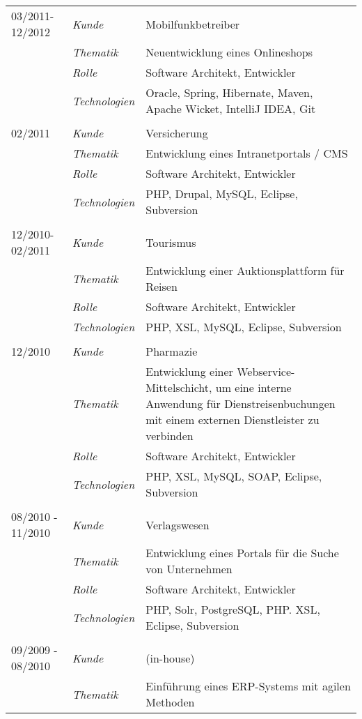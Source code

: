 \begin{longtable}{@{}>{}p{4cm}>{\itshape}p{2cm}>{}p{9cm}}
\\
03/2011-12/2012     & Kunde 	    & Mobilfunkbetreiber\\
\nopagebreak		& Thematik	    & Neuentwicklung eines Onlineshops \\
\nopagebreak		& Rolle 	    & Software Architekt, Entwickler\\
\nopagebreak		& Technologien	& Oracle, Spring, Hibernate, Maven, Apache Wicket, IntelliJ IDEA, Git\\
\\
02/2011             & Kunde 	    & Versicherung\\
\nopagebreak		& Thematik	    & Entwicklung eines Intranetportals / CMS\\
\nopagebreak		& Rolle 	    & Software Architekt, Entwickler\\
\nopagebreak		& Technologien	& PHP, Drupal, MySQL, Eclipse, Subversion\\
\\
12/2010-02/2011     & Kunde 	    & Tourismus\\
\nopagebreak		& Thematik	    & Entwicklung einer Auktionsplattform für Reisen\\
\nopagebreak		& Rolle 	    & Software Architekt, Entwickler\\
\nopagebreak		& Technologien	& PHP, XSL, MySQL, Eclipse, Subversion\\
\\
12/2010         	& Kunde 	    & Pharmazie\\
\nopagebreak		& Thematik	    & Entwicklung einer Webservice-Mittelschicht, um eine interne Anwendung für Dienstreisenbuchungen mit einem externen Dienstleister zu verbinden\\
\nopagebreak		& Rolle 	    & Software Architekt, Entwickler\\
\nopagebreak		& Technologien	& PHP, XSL, MySQL, SOAP, Eclipse, Subversion\\
\\
08/2010 - 11/2010	& Kunde 	    & Verlagswesen\\
\nopagebreak		& Thematik	    & Entwicklung eines Portals für die Suche von Unternehmen\\
\nopagebreak		& Rolle 	    & Software Architekt, Entwickler\\
\nopagebreak		& Technologien	& PHP, Solr, PostgreSQL, PHP. XSL, Eclipse, Subversion\\
\\
09/2009 - 08/2010	& Kunde 	    & (in-house)\\
\nopagebreak		& Thematik	    & Einführung eines ERP-Systems mit agilen Methoden\\

\end{longtable}
